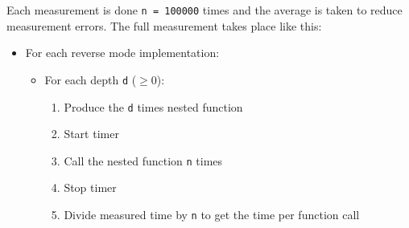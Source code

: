 Each measurement is done \lstinline{n = 100000} times and the average is taken to reduce measurement errors. The full measurement takes place like this:
\begin{itemize}
    \item
        For each reverse mode implementation:
        \begin{itemize}
            \item
                For each depth \lstinline{d} ($\geq 0$):
                \begin{enumerate}
                    \item Produce the \lstinline{d} times nested function
                    \item Start timer
                    \item Call the nested function \lstinline{n} times
                    \item Stop timer
                    \item Divide measured time by \lstinline{n} to get the time per function call
                \end{enumerate}
        \end{itemize}

\end{itemize}

